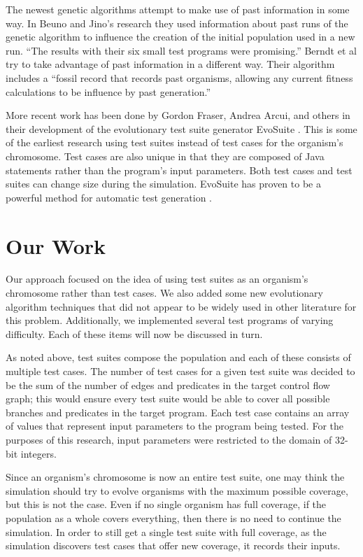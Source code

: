\documentclass[runningheads]{llncs}
\begin{document}
The newest genetic algorithms attempt to make use of past information in some way. In Beuno and Jino's research they used information about past runs of the genetic algorithm to influence the creation of the initial population used in a new run\cite{limits6}. ``The results with their six small test programs were promising.''\cite{limits6} Berndt et al try to take advantage of past information in a different way. Their algorithm includes a ``fossil record that records past organisms, allowing any current fitness calculations to be influence by past generation.''\cite{limits6}

More recent work has been done by Gordon Fraser, Andrea Arcui, and others in their development of the evolutionary test suite generator EvoSuite \cite{FraserTestSuites}. This is some of the earliest research using test suites instead of test cases for the organism's chromosome. Test cases are also unique in that they are composed of Java statements rather than the program's input parameters. Both test cases and test suites can change size during the simulation. EvoSuite has proven to be a powerful method for automatic test generation \cite{Fraser}.






\newpage
\section{Our Work}
Our approach focused on the idea of using test suites as an organism's chromosome rather than test cases. We also added some new evolutionary algorithm techniques that did not appear to be widely used in other literature for this problem. Additionally, we implemented several test programs of varying difficulty. Each of these items will now be discussed in turn.

As noted above, test suites compose the population and each of these consists of multiple test cases. The number of test cases for a given test suite was decided to be the sum of the number of edges and predicates in the target control flow graph; this would ensure every test suite would be able to cover all possible branches and predicates in the target program. Each test case contains an array of values that represent input parameters to the program being tested. For the purposes of this research, input parameters were restricted to the domain of 32-bit integers.

Since an organism’s chromosome is now an entire test suite, one may think the simulation should try to evolve organisms with the maximum possible coverage, but this is not the case. Even if no single organism has full coverage, if the population as a whole covers everything, then there is no need to continue the simulation. In order to still get a single test suite with full coverage, as the simulation discovers test cases that offer new coverage, it records their inputs. 
\end{document}
